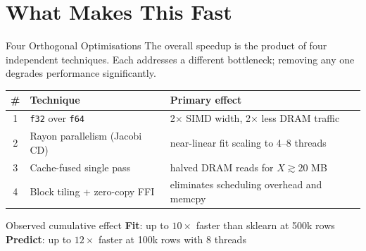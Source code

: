 \documentclass[aspectratio=169]{beamer}
\begin{document}
\section{What Makes This Fast}

\begin{frame}{Four Orthogonal Optimisations}
  The overall speedup is the product of four independent techniques.
  Each addresses a different bottleneck; removing any one degrades performance
  significantly.

  \vspace{0.6em}
  \begin{center}
  \begin{tabular}{clp{6cm}}
    \hline
    \textbf{\#} & \textbf{Technique} & \textbf{Primary effect} \\
    \hline
    1 & \texttt{f32} over \texttt{f64}    & 2$\times$ SIMD width, 2$\times$ less DRAM traffic \\
    2 & Rayon parallelism (Jacobi CD)     & near-linear fit scaling to 4--8 threads \\
    3 & Cache-fused single pass           & halved DRAM reads for $X \gtrsim 20$ MB \\
    4 & Block tiling + zero-copy FFI      & eliminates scheduling overhead and memcpy \\
    \hline
  \end{tabular}
  \end{center}

  \vspace{0.6em}
  \begin{block}{Observed cumulative effect}
    \textbf{Fit}: up to $10\times$ faster than sklearn at 500k rows \\
    \textbf{Predict}: up to $12\times$ faster at 100k rows with 8 threads
  \end{block}
\end{frame}
\end{document}
